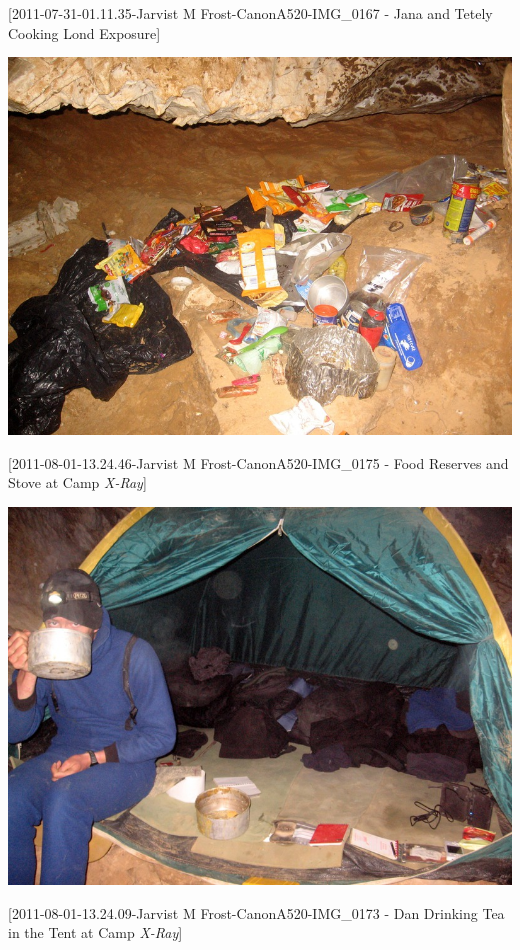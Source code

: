 {[}2011-07-31-01.11.35-Jarvist M Frost-CanonA520-IMG\_0167 - Jana and
Tetely Cooking Lond Exposure{]}

\includegraphics{UgLog1012/59.png}

{[}2011-08-01-13.24.46-Jarvist M Frost-CanonA520-IMG\_0175 - Food
Reserves and Stove at Camp \emph{X-Ray}{]}

\includegraphics{UgLog1012/60.png}

{[}2011-08-01-13.24.09-Jarvist M Frost-CanonA520-IMG\_0173 - Dan
Drinking Tea in the Tent at Camp \emph{X-Ray}{]}

